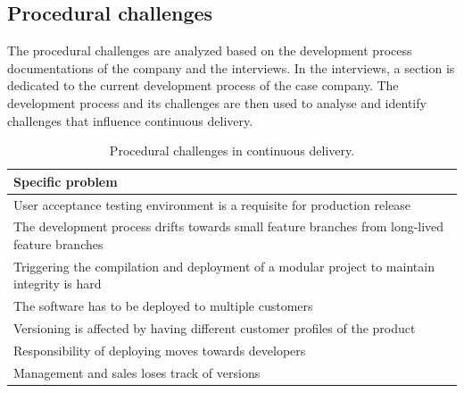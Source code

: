 \documentclass[lnbip]{svmultln}
\begin{document}





\subsection{Procedural challenges}
The procedural challenges are analyzed based on the development process documentations of the company and the interviews. In the interviews, a section is dedicated to the current development process of the case company. The development process and its challenges are then used to analyse and identify challenges that influence continuous delivery.

\begin{table}[htb]
    \begin{tabular}{ | p{12cm} |}
    \hline
    \textbf{Specific problem} \\ \hline
    User acceptance testing environment is a requisite for production release \\ \hline
    The development process drifts towards small feature branches from long-lived feature branches \\ \hline
  Triggering the compilation and deployment of a modular project to maintain integrity is hard \\ \hline
  The software has to be deployed to multiple customers \\ \hline
  Versioning is affected by having different customer profiles of the product \\ \hline
  Responsibility of deploying moves towards developers \\ \hline
  Management and sales loses track of versions \\
    \hline
    \end{tabular}
    \caption{Procedural challenges in continuous delivery.}
    \end{table}
\end{document}
